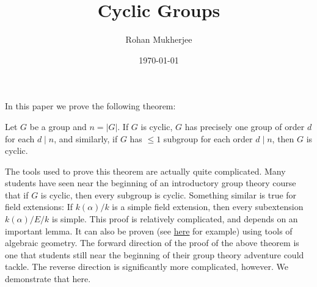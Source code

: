 \documentclass[12pt]{article}
\title{Cyclic Groups}
\date{\today}
\author{Rohan Mukherjee}
\newenvironment{theorem}{\begin{mytheorem}}{\end{mytheorem}}
\theoremstyle{definitionstyle}
\begin{document}
	\maketitle
	In this paper we prove the following theorem:
	\begin{theorem}
		Let $G$ be a group and $n = |G|$. If $G$ is cyclic, $G$ has precisely one group of order $d$ for each $d \mid n$, and similarly, if $G$ has $\leq 1$ subgroup for each order $d \mid n$, then $G$ is cyclic.
	\end{theorem}
	The tools used to prove this theorem are actually quite complicated. Many students have seen near the beginning of an introductory group theory course that if $G$ is cyclic, then every subgroup is cyclic. Something similar is true for field extensions: If $k(\alpha)/k$ is a simple field extension, then every subextension $k(\alpha)/E/k$ is simple. This proof is relatively complicated, and depends on an important lemma. It can also be proven (see \href{https://math.stackexchange.com/questions/3285146/is-every-subextension-of-a-simple-field-extension-simple-itself}{here} for example) using tools of algebraic geometry. The forward direction of the proof of the above theorem is one that students still near the beginning of their group theory adventure could tackle. The reverse direction is significantly more complicated, however. We demonstrate that here. 
\end{document}
